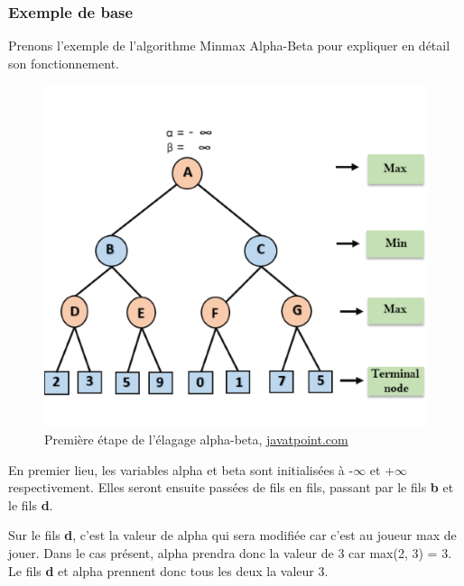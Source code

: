\documentclass{article}
\begin{document}
\subsubsection{Exemple de base}

Prenons l'exemple de l'algorithme Minmax Alpha-Beta pour expliquer en détail son fonctionnement.



\begin{figure}[!h]
\centering
\includegraphics[scale=0.7]{img/alpha-beta-pruning-step1.png}
\caption{Première étape de l'élagage alpha-beta,
\href{https://www.javatpoint.com/ai-alpha-beta-pruning}{javatpoint.com}}
\end{figure}

En premier lieu, les variables alpha et beta sont initialisées à -$\infty$ et +$\infty$ respectivement. Elles seront ensuite passées de fils en fils, passant par le fils \textbf{b} et le fils \textbf{d}.

Sur le fils \textbf{d}, c'est la valeur de alpha qui sera modifiée car c'est au joueur max de jouer. Dans le cas présent, alpha prendra donc la valeur de 3 car max(2, 3) = 3. Le fils \textbf{d} et alpha prennent donc tous les deux la valeur 3.
\end{document}
